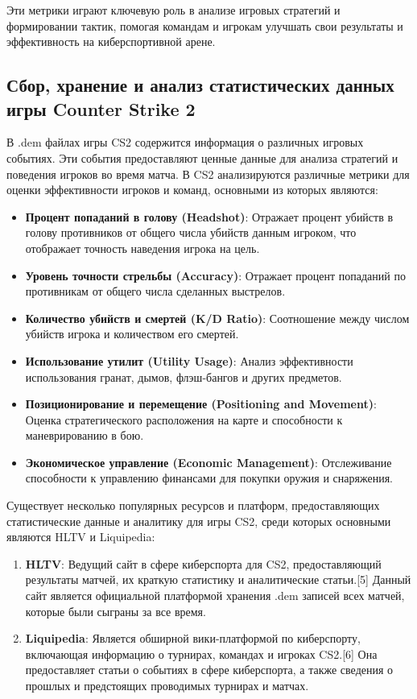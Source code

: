 Эти метрики играют ключевую роль в анализе игровых стратегий и формировании тактик, помогая командам и игрокам улучшать свои результаты и эффективность на киберспортивной арене.
\subsection{Сбор, хранение и анализ статистических данных игры Counter Strike 2}

В .dem файлах игры CS2 содержится информация о различных игровых событиях. Эти события предоставляют ценные данные для анализа стратегий и поведения игроков во время матча. В CS2 анализируются различные метрики для оценки эффективности игроков и команд, основными из которых являются:

\begin{itemize}
	\item \textbf{Процент попаданий в голову (Headshot)}:
	Отражает процент убийств в голову противников от общего числа убийств данным игроком, что отображает точность наведения игрока на цель.
	\item \textbf{Уровень точности стрельбы (Accuracy)}:
	Отражает процент попаданий по противникам от общего числа сделанных выстрелов.
	\item \textbf{Количество убийств и смертей (K/D Ratio)}:
	Соотношение между числом убийств игрока и количеством его смертей.
	\item \textbf{Использование утилит (Utility Usage)}:
	Анализ эффективности использования гранат, дымов, флэш-бангов и других предметов.
	\item \textbf{Позиционирование и перемещение (Positioning and Movement)}:
	Оценка стратегического расположения на карте и способности к маневрированию в бою.
	\item \textbf{Экономическое управление (Economic Management)}:
	Отслеживание способности к управлению финансами для покупки оружия и снаряжения.
\end{itemize}

Существует несколько популярных ресурсов и платформ, предоставляющих статистические данные и аналитику для игры CS2, среди которых основными являются HLTV и Liquipedia:

\begin{enumerate}
	\item \textbf{HLTV}:
	Ведущий сайт в сфере киберспорта для CS2, предоставляющий результаты матчей, их краткую статистику и аналитические статьи.[5] Данный сайт является официальной платформой хранения .dem записей всех матчей, которые были сыграны за все время.
	\item \textbf{Liquipedia}:
	Является обширной вики-платформой по киберспорту, включающая информацию о турнирах, командах и игроках CS2.[6] Она предоставляет статьи о событиях в сфере киберспорта, а также сведения о прошлых и предстоящих проводимых турнирах и матчах.
\end{enumerate}

